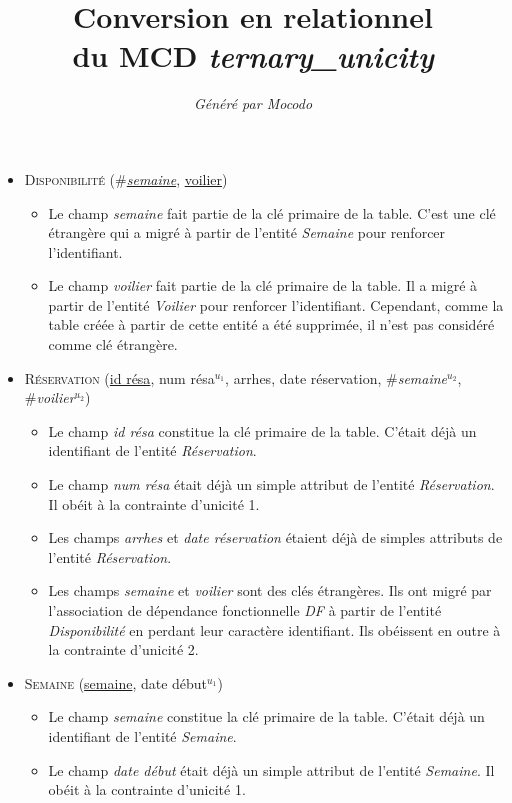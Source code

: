 \documentclass[a4paper]{article}
\title{Conversion en relationnel\\du MCD \emph{ternary_unicity}}
\author{\emph{Généré par Mocodo}}
\newcommand{\relat}[1]{\textsc{#1}}
\newcommand{\attr}[1]{#1}
\newcommand{\prim}[1]{\uline{#1}}
\newcommand{\foreign}[1]{\#\textsl{#1}}
\begin{document}
\maketitle

\begin{itemize}
  \item \relat{Disponibilité} (\foreign{\prim{semaine}}, \prim{voilier})
  \begin{itemize}
    \item Le champ \emph{semaine} fait partie de la clé primaire de la table. C'est une clé étrangère qui a migré à partir de l'entité \emph{Semaine} pour renforcer l'identifiant.
    \item Le champ \emph{voilier} fait partie de la clé primaire de la table. Il a migré à partir de l'entité \emph{Voilier} pour renforcer l'identifiant. Cependant, comme la table créée à partir de cette entité a été supprimée, il n'est pas considéré comme clé étrangère.
  \end{itemize}

  \item \relat{Réservation} (\prim{id résa}, \attr{num résa}$^{u_1}$, \attr{arrhes}, \attr{date réservation}, \foreign{semaine}$^{u_2}$, \foreign{voilier}$^{u_2}$)
  \begin{itemize}
    \item Le champ \emph{id résa} constitue la clé primaire de la table. C'était déjà un identifiant de l'entité \emph{Réservation}.
    \item Le champ \emph{num résa} était déjà un simple attribut de l'entité \emph{Réservation}. Il obéit à la contrainte d'unicité 1.
    \item Les champs \emph{arrhes} et \emph{date réservation} étaient déjà de simples attributs de l'entité \emph{Réservation}.
    \item Les champs \emph{semaine} et \emph{voilier} sont des clés étrangères. Ils ont migré par l'association de dépendance fonctionnelle \emph{DF} à partir de l'entité \emph{Disponibilité} en perdant leur caractère identifiant. Ils obéissent en outre à la contrainte d'unicité 2.
  \end{itemize}

  \item \relat{Semaine} (\prim{semaine}, \attr{date début}$^{u_1}$)
  \begin{itemize}
    \item Le champ \emph{semaine} constitue la clé primaire de la table. C'était déjà un identifiant de l'entité \emph{Semaine}.
    \item Le champ \emph{date début} était déjà un simple attribut de l'entité \emph{Semaine}. Il obéit à la contrainte d'unicité 1.
  \end{itemize}

\end{itemize}
\end{document}
